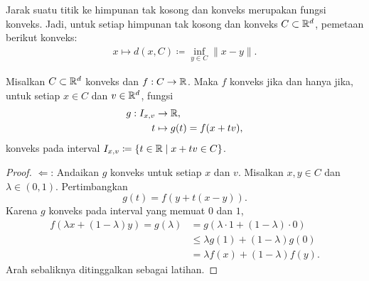 \begin{example}
    Jarak suatu titik ke himpunan tak kosong dan konveks merupakan fungsi konveks. Jadi, untuk setiap himpunan tak kosong dan konveks $C\subset\mathbb{R}^d$, pemetaan berikut konveks:
    \begin{equation}
        \begin{aligned}
            x\mapsto d(x,C)\coloneqq\inf_{y\in C}\|x-y\|.
        \end{aligned}
    \end{equation}
\end{example}

\begin{theorem}
    Misalkan $C\subset\mathbb{R}^d$ konveks dan $f:C\rightarrow\mathbb{R}$. Maka $f$ konveks jika dan hanya jika, untuk setiap $x\in C$ dan $v\in\mathbb{R}^d$, fungsi
    \begin{equation}
        \begin{aligned}
            g:I_{x,v}&\rightarrow\mathbb{R},\\
            t&\mapsto g(t)=f(x+tv),
        \end{aligned}
    \end{equation}
    konveks pada interval $I_{x,v}\coloneqq\{t\in\mathbb{R}\mid x+tv\in C\}$.
\end{theorem}
\begin{proof}
    $\Leftarrow$: Andaikan $g$ konveks untuk setiap $x$ dan $v$. Misalkan $x,y\in C$ dan $\lambda\in(0,1)$. Pertimbangkan
    \begin{equation}
        g(t)=f(y+t(x-y)).
    \end{equation}
    Karena $g$ konveks pada interval yang memuat $0$ dan $1$,
    \begin{equation}
        \begin{aligned}
            f(\lambda x+(1-\lambda)y)
            =g(\lambda)
            &=g(\lambda\cdot1+(1-\lambda)\cdot0)\\
            &\leq\lambda g(1)+(1-\lambda)g(0)\\
            &=\lambda f(x)+(1-\lambda)f(y).
        \end{aligned}
    \end{equation}
    Arah sebaliknya ditinggalkan sebagai latihan.
\end{proof}

